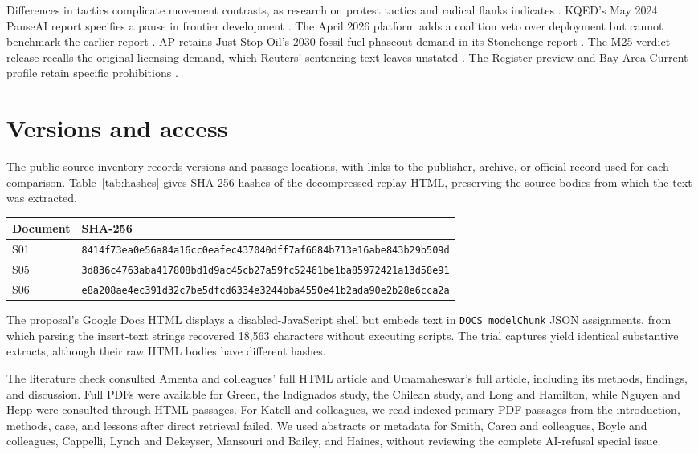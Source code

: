 \documentclass[11pt]{article}
\begin{document}
Differences in tactics complicate movement contrasts, as research on protest tactics and radical flanks indicates \citep{boyle,haines}. KQED's May 2024 PauseAI report specifies a pause in frontier development \citep{rodriguez}. The April 2026 platform adds a coalition veto over deployment but cannot benchmark the earlier report \citep{pauseevent,pauseproposal}. AP retains Just Stop Oil's 2030 fossil-fuel phaseout demand in its Stonehenge report \citep{ap,jsostone}. The M25 verdict release recalls the original licensing demand, which Reuters' sentencing text leaves unstated \citep{jsoverdict,tobin}. The Register preview and Bay Area Current profile retain specific prohibitions \citep{claburn,wang}.

\section{Versions and access}
\label{app:access}
The public source inventory records versions and passage locations, with links to the publisher, archive, or official record used for each comparison. Table~\ref{tab:hashes} gives SHA-256 hashes of the decompressed replay HTML, preserving the source bodies from which the text was extracted.

\begin{center}\small
\begin{tabular}{l l}
\toprule Document & SHA-256\\\midrule
S01 & \texttt{8414f73ea0e56a84a16cc0eafec437040dff7af6684b713e16abe843b29b509d}\\
S05 & \texttt{3d836c4763aba417808bd1d9ac45cb27a59fc52461be1ba85972421a13d58e91}\\
S06 & \texttt{e8a208ae4ec391d32c7be5dfcd6334e3244bba4550e41b2ada90e2b28e6cca2a}\\
\bottomrule
\end{tabular}
\label{tab:hashes}
\end{center}

The proposal's Google Docs HTML displays a disabled-JavaScript shell but embeds text in \texttt{DOCS\_modelChunk} JSON assignments, from which parsing the insert-text strings recovered 18,563 characters without executing scripts. The trial captures yield identical substantive extracts, although their raw HTML bodies have different hashes.

The literature check consulted Amenta and colleagues' full HTML article and Umamaheswar's full article, including its methods, findings, and discussion. Full PDFs were available for Green, the Indignados study, the Chilean study, and Long and Hamilton, while Nguyen and Hepp were consulted through HTML passages. For Katell and colleagues, we read indexed primary PDF passages from the introduction, methods, case, and lessons after direct retrieval failed. We used abstracts or metadata for Smith, Caren and colleagues, Boyle and colleagues, Cappelli, Lynch and Dekeyser, Mansouri and Bailey, and Haines, without reviewing the complete AI-refusal special issue.
\end{document}
